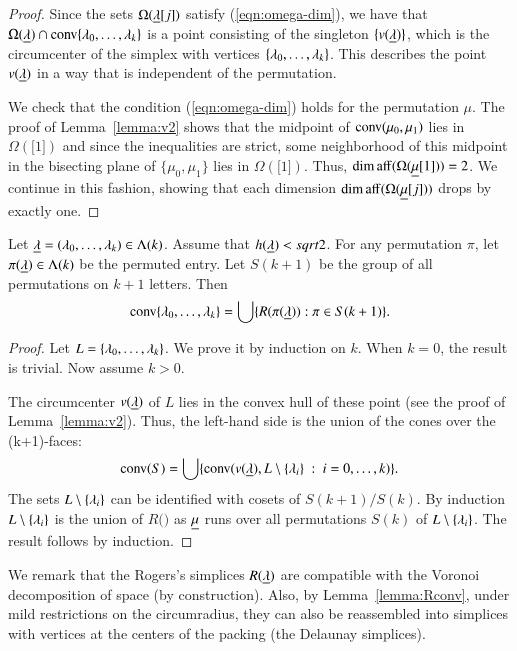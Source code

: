 \begin{proof} 
Since the sets $\Omega({\underline{\lambda}}[j])$ satisfy (\ref{eqn:omega-dim}), we have that
$\Omega({\underline{\lambda}})\cap {\operatorname{conv}}\{\lambda_0,\ldots,\lambda_k\}$ is a point consisting of the singleton $\{v({\underline{\lambda}})\}$, which is the
circumcenter of the simplex with vertices $\{\lambda_0,\ldots,\lambda_k\}$.  This describes
the point $v({\underline{\lambda}})$ in a way that is independent of the permutation.

We check that the condition (\ref{eqn:omega-dim}) holds for the permutation $\mu$.
The proof of Lemma~\ref{lemma:v2} shows that the midpoint of ${\operatorname{conv}}(\mu_0,\mu_1)$
lies in $\Omega(\bm[1])$ and since the inequalities are strict, some neighborhood
of this midpoint in the bisecting plane of $\{\mu_0,\mu_1\}$ lies in $\Omega(\bm[1])$.
Thus, $\operatorname{dim\,aff}(\Omega({\underline{\mu}}[1]))=2$.  We continue in this fashion, showing that each dimension
$\operatorname{dim\,aff}(\Omega({\underline{\mu}}[j]))$ drops by exactly one.
\end{proof}

\begin{lemma}\label{lemma:Rconv} Let ${\underline{\lambda}} = (\lambda_0,\ldots,\lambda_k)\in\Lambda(k)$.  Assume that $h({\underline{\lambda}})<sqrt2$.
For any permutation $\pi$, let $\pi({\underline{\lambda}})\in\Lambda(k)$ be the permuted entry.  Let
$S(k+1)$ be the group of all permutations on $k+1$ letters.   Then
$$
{\operatorname{conv}}\{\lambda_0,\ldots,\lambda_k\} = \bigcup \{ R(\pi({\underline{\lambda}})) : \pi\in S(k+1)\}.
$$
\end{lemma}

\begin{proof} Let $L = \{\lambda_0,\ldots,\lambda_k\}$.  We prove it by induction on $k$.
When $k=0$, the result is trivial.  Now assume $k>0$.

The circumcenter $v({\underline{\lambda}})$ of $L$ lies in the convex hull of these
point (see the proof of Lemma~\ref{lemma:v2}).  Thus, the left-hand side is the union
of the cones over the (k+1)-faces:
$$
{\operatorname{conv}}(S) = \bigcup\{ {\operatorname{conv}}(v({\underline{\lambda}}),L\setminus \{\lambda_i\}\ :\  i=0,\ldots,k) \}.
$$
The sets $L\setminus \{\lambda_i\}$ can be identified with  cosets of $S(k+1) /S(k)$.
By induction $L\setminus \{\lambda_i\}$ is the union of $R(\bm)$ as ${\underline{\mu}}$ runs
over all permutations $S(k)$ of $L\setminus \{\lambda_i\}$.
The result follows by induction.
\end{proof}

We remark that the Rogers's simplices $R({\underline{\lambda}})$ are compatible with the Voronoi
decomposition of space (by construction).  Also, by Lemma~\ref{lemma:Rconv}, under
mild restrictions on the circumradius, they can also be reassembled into simplices
with vertices at the centers of the packing (the Delaunay simplices).  

